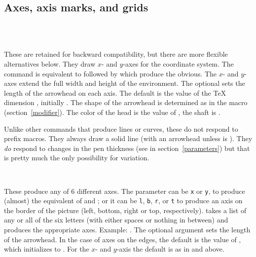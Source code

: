\documentclass[letterpaper]{article}
\begin{document}
\subsection{Axes, axis marks, and grids}\label{axesthings}

\begin{cd}
\\
\\
%
%
%
\end{cd}

These are retained for backward compatibility, but there are more
flexible alternatives below. They draw $x$- and  $y$-axes for the
coordinate system. The command  is equivalent to 
followed by  which produce the obvious. The $x$- and $y$-axes
extend the full width and height of the  environment. The
optional  sets the length of the arrowhead on each axis. The
default is the value of the \TeX{} dimension , initially
\dim{5pt}. The shape of the arrowhead is determined as in the 
macro (section~\ref{modifier}). The color of the head is the value of
, the shaft is .

Unlike other commands that produce lines or curves, these do not respond
to prefix macros. They always draw a solid line (with an arrowhead
unless  is \dim{0pt}). They \emph{do} respond to changes
in the pen thickness (see  in section~\ref{parameters}) but
that is pretty much the only possibility for variation.

\begin{cd}
\\
%
%
%
\end{cd}

These produce any of 6 different axes. The parameter  can
be \texttt{x} or \texttt{y}, to produce (almost) the equivalent of
 and ; or it can be \texttt{l}, \texttt{b},
\texttt{r}, or \texttt{t} to produce an axis on the border of the
picture (left, bottom, right or top, respectively).  takes a
list of any or all of the six letters (with either spaces or nothing in
between) and produces the appropriate axes. Example:
. The optional argument sets the length of the
arrowhead. In the case of axes on the edges, the default is the value of
, which \mfp{} initializes to \dim{0pt}. For the $x$-
and $y$-axis the default is  as in  and
 above.
\end{document}
